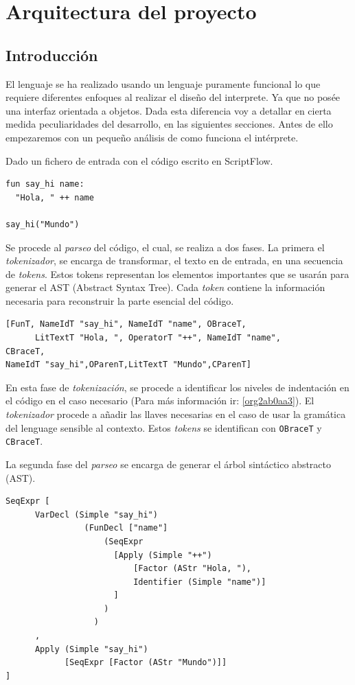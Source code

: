 \documentclass[11pt]{article}
\begin{document}
\section{Arquitectura del proyecto}
\label{sec:orgbc49ee9}

\subsection{Introducción}
\label{sec:org1ca05f7}

El lenguaje se ha realizado usando un lenguaje puramente funcional lo que
requiere diferentes enfoques al realizar el diseño del interprete. Ya que
no posée una interfaz orientada a objetos. Dada esta diferencia voy a
detallar en cierta medida peculiaridades del desarrollo, en las siguientes
secciones. Antes de ello empezaremos con un pequeño análisis de como
funciona el intérprete.

Dado un fichero de entrada con el código escrito en ScriptFlow.

\begin{verbatim}
fun say_hi name:
  "Hola, " ++ name

say_hi("Mundo")
\end{verbatim}


Se procede al \emph{parseo} del código, el cual, se realiza a dos fases. La primera el
\emph{tokenizador}, se encarga de transformar, el texto en de entrada, en una
secuencia de \emph{tokens}. Estos tokens representan los elementos importantes
que se usarán para generar el AST (Abstract Syntax Tree). Cada \emph{token} contiene la información
necesaria para reconstruir la parte esencial del código.

\begin{verbatim}
[FunT, NameIdT "say_hi", NameIdT "name", OBraceT,
      LitTextT "Hola, ", OperatorT "++", NameIdT "name",
CBraceT,
NameIdT "say_hi",OParenT,LitTextT "Mundo",CParenT]
\end{verbatim}

En esta fase de \emph{tokenización}, se procede a identificar los niveles de
indentación en el código en el caso necesario (Para más información ir: \ref{org2ab0aa3}).
El \emph{tokenizador} procede a añadir las llaves necesarias en el caso de usar la
gramática del lenguage sensible al contexto. Estos \emph{tokens} se identifican con
\texttt{OBraceT} y \texttt{CBraceT}.

La segunda fase del \emph{parseo} se encarga de generar el árbol sintáctico
abstracto (AST).

\begin{verbatim}
SeqExpr [
      VarDecl (Simple "say_hi")
                (FunDecl ["name"]
                    (SeqExpr
                      [Apply (Simple "++")
                          [Factor (AStr "Hola, "),
                          Identifier (Simple "name")]
                      ]
                    )
                  )
      ,
      Apply (Simple "say_hi")
            [SeqExpr [Factor (AStr "Mundo")]]
]
\end{verbatim}
\end{document}
